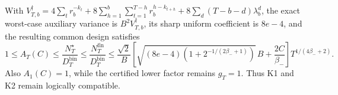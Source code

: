 With \(V_{T,b}^{\dagger}=4\sum_t r_b^{-k_t}+8\sum_{h=1}^b\sum_{t=1}^{T-h}r_b^{h-k_{t+h}}+8\sum_d(T-b-d)\lambda_b^d\), the exact worst-case auxiliary variance is \(B^2V_{T,b}^{\dagger}\), its sharp uniform coefficient is \(8e-4\), and the resulting common design satisfies \[1\le A_T(C)\le\frac{N_T^\star}{D_T^{\mathrm{bin}}}\le\frac{N_T^{\mathrm{fin}}}{D_T^{\mathrm{bin}}}\le\frac{\sqrt2}{B}\left[\sqrt{(8e-4)\left(1+2^{-1/(2\beta_-+1)}\right)}\,B+\frac{2C}{\beta_-}\right]T^{1/(4\beta_-+2)}.\] Also \(A_1(C)=1\), while the certified lower factor remains \(g_T=1\). Thus K1 and K2 remain logically compatible.
